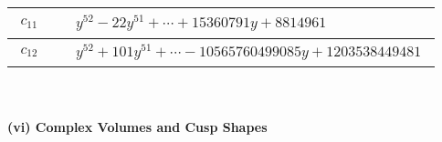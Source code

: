 \documentclass[1p]{elsarticle_modified}
\theoremstyle{definition}
\begin{document}
\begin{tabular}{m{50pt}|m{274pt}}
\hline $$\begin{aligned}c_{11}\end{aligned}$$&$\begin{aligned}
&y^{52}-22 y^{51}+\cdots+15360791 y+8814961
\end{aligned}$\\
\hline $$\begin{aligned}c_{12}\end{aligned}$$&$\begin{aligned}
&y^{52}+101 y^{51}+\cdots-10565760499085 y+1203538449481
\end{aligned}$\\
\hline
\end{tabular}\\~\\
\newpage\flushleft \textbf{(vi) Complex Volumes and Cusp Shapes}
\end{document}
